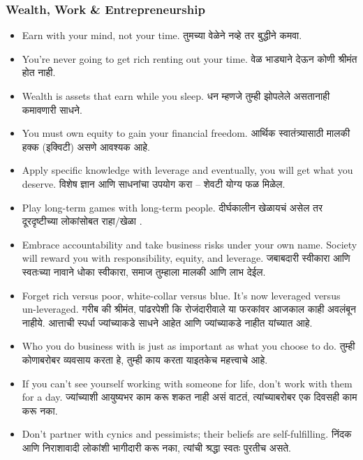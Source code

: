 \begin{frame}[fragile]\frametitle{Wealth, Work \& Entrepreneurship}
\begin{itemize}
  \item Earn with your mind, not your time. तुमच्या वेळेने नव्हे तर बुद्धीने कमवा.

  \item You’re never going to get rich renting out your time. वेळ भाड्याने देऊन कोणी श्रीमंत होत नाही.

  \item Wealth is assets that earn while you sleep. धन म्हणजे तुम्ही झोपलेले असतानाही कमावणारी साधने.

  \item You must own equity to gain your financial freedom. आर्थिक स्वातंत्र्यासाठी मालकी हक्क (इक्विटी) असणे आवश्यक आहे.

  \item Apply specific knowledge with leverage and eventually, you will get what you deserve. विशेष ज्ञान आणि साधनांचा उपयोग करा – शेवटी योग्य फळ मिळेल.

  \item Play long-term games with long-term people. दीर्घकालीन खेळायचं असेल तर दूरदृष्टीच्या लोकांसोबत राहा/खेळा .

  \item Embrace accountability and take business risks under your own name. Society will reward you with responsibility, equity, and leverage. जबाबदारी स्वीकारा आणि स्वतःच्या नावाने धोका स्वीकारा, समाज तुम्हाला मालकी आणि लाभ देईल.

  \item Forget rich versus poor, white-collar versus blue. It’s now leveraged versus un-leveraged. 
गरीब की श्रीमंत, पांढरपेशी कि रोजंदारीवाले या फरकांवर आजकाल काही अवलंबून नाहीये. आत्ताची स्पर्धा  ज्यांच्याकडे साधने आहेत आणि ज्यांच्याकडे नाहीत यांच्यात आहे.

  \item Who you do business with is just as important as what you choose to do. तुम्ही कोणाबरोबर व्यवसाय करता हे, तुम्ही काय करता याइतकेच महत्त्वाचे आहे.

  \item If you can’t see yourself working with someone for life, don’t work with them for a day. ज्यांच्याशी आयुष्यभर काम करू शकत नाही असं वाटतं, त्यांच्याबरोबर एक दिवसही काम करू नका.

  \item Don’t partner with cynics and pessimists; their beliefs are self-fulfilling. निंदक आणि निराशावादी लोकांशी भागीदारी करू नका, त्यांची श्रद्धा स्वतः पुरतीच असते.


\end{itemize}
\end{frame}
